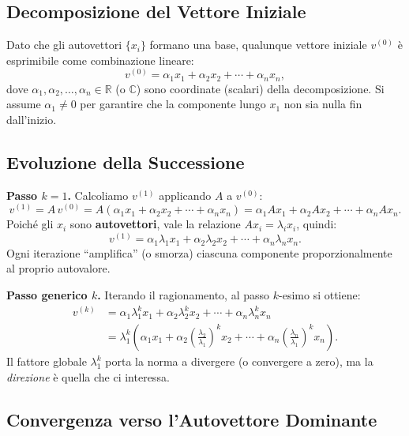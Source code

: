 \documentclass[a4paper,12pt]{article}
\theoremstyle{definition}
\theoremstyle{remark}
\begin{document}
\subsection{Decomposizione del Vettore Iniziale}

Dato che gli autovettori $\{x_i\}$ formano una base, qualunque vettore iniziale $v^{(0)}$
è esprimibile come combinazione lineare:
\[
  v^{(0)} = \alpha_1 x_1 + \alpha_2 x_2 + \cdots + \alpha_n x_n,
\]
dove $\alpha_1, \alpha_2, \ldots, \alpha_n \in \mathbb{R}$ (o $\mathbb{C}$) sono coordinate
(scalari) della decomposizione. Si assume $\alpha_1 \neq 0$ per garantire che la componente
lungo $x_1$ non sia nulla fin dall'inizio.

\subsection{Evoluzione della Successione}

\noindent\textbf{Passo $k=1$.} Calcoliamo $v^{(1)}$ applicando $A$ a $v^{(0)}$:
\[
  v^{(1)} = A\,v^{(0)}
  = A(\alpha_1 x_1 + \alpha_2 x_2 + \cdots + \alpha_n x_n)
  = \alpha_1 A x_1 + \alpha_2 A x_2 + \cdots + \alpha_n A x_n.
\]
Poiché gli $x_i$ sono \textbf{autovettori}, vale la relazione $Ax_i = \lambda_i x_i$, quindi:
\[
  v^{(1)} = \alpha_1 \lambda_1 x_1 + \alpha_2 \lambda_2 x_2 + \cdots + \alpha_n \lambda_n x_n.
\]
Ogni iterazione ``amplifica'' (o smorza) ciascuna componente proporzionalmente al proprio
autovalore.

\medskip
\noindent\textbf{Passo generico $k$.} Iterando il ragionamento, al passo $k$-esimo si ottiene:
\begin{align}
  v^{(k)}
  &= \alpha_1 \lambda_1^k x_1 + \alpha_2 \lambda_2^k x_2 + \cdots + \alpha_n \lambda_n^k x_n \nonumber \\
  &= \lambda_1^k
     \left(
       \alpha_1 x_1
       + \alpha_2 \left(\frac{\lambda_2}{\lambda_1}\right)^k x_2
       + \cdots
       + \alpha_n \left(\frac{\lambda_n}{\lambda_1}\right)^k x_n
     \right). \label{eq:vk-decomp}
\end{align}
Il fattore globale $\lambda_1^k$ porta la norma a divergere (o convergere a zero), ma la
\emph{direzione} è quella che ci interessa.

\subsection{Convergenza verso l'Autovettore Dominante}
\end{document}
